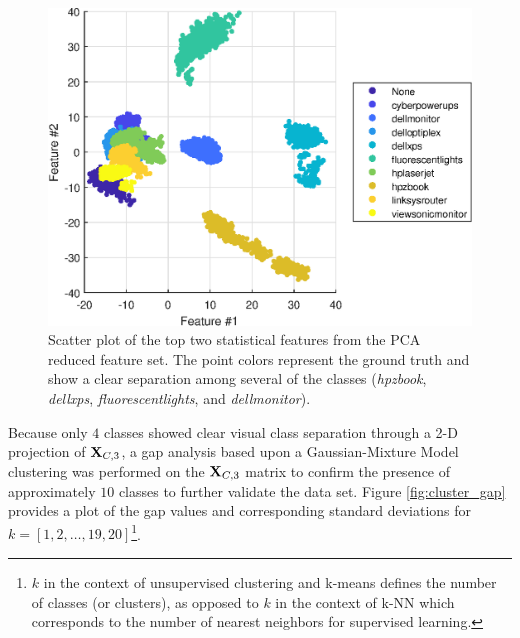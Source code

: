 \begin{figure}[tb]
	\includegraphics[width=\textwidth]{./dasp_algorithm_results/dasp_stat_cluster_truth.eps}
	\centering
	\caption{Scatter plot of the top two statistical features from the PCA reduced feature set.  The point colors represent the ground truth and show a clear separation among several of the classes (\textit{hpzbook}, \textit{dellxps}, \textit{fluorescentlights}, and \textit{dellmonitor}).}
	\label{fig:cluster_truth}
\end{figure}

Because only $4$ classes showed clear visual class separation through a 2-D projection of $\textit{\bf{X}}_{C,3}$, a gap analysis based upon a Gaussian-Mixture Model clustering was performed on the $\textit{\bf{X}}_{C,3}$ matrix to confirm the presence of approximately $10$ classes to further validate the data set.  Figure \ref{fig:cluster_gap} provides a plot of the gap values and corresponding standard deviations for $k = [1,2, \ldots, 19, 20]$\footnote{$k$ in the context of unsupervised clustering and k-means defines the number of classes (or clusters), as opposed to $k$ in the context of k-NN which corresponds to the number of nearest neighbors for supervised learning.}. 

